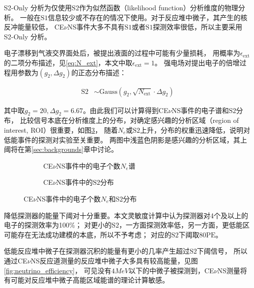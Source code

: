 S2-Only 分析为仅使用$\mathrm{S2}$作为似然函数（likelihood function）分析维度的物理分析。
一般在$\mathrm{S1}$信息较少或不存在的情况下使用。对于反应堆中微子，其产生的核反冲能量较低，
CE$\nu$NS事件大多不具有$\mathrm{S1}$或者$\mathrm{S1}$探测效率很低，所以主要采用S2-Only 分析。

电子漂移到气液交界面处后，被提出液面的过程中可能有少量损耗，
用概率为$\epsilon_\mathrm{ext}$的二项分布描述，见\ref{eq:N_ext}，本文中取$\epsilon_\mathrm{ext}=1$。
强电场对提出电子的倍增过程用参数为$(g_2,\Delta g_2)$的正态分布描述：

\begin{align}
    \label{eq:s2}
    \mathrm{S2} &\sim \mathrm{Gauss}\left(g_2,\sqrt{N_\mathrm{ext}}\cdot\Delta g_2\right)
\end{align}

其中取$g_2=20,\Delta g_2=6.67$。由此我们可以计算得到CE$\nu$NS事件的电子谱和$\mathrm{S2}$分布，
比较信号本底在分析维度上的分布，对确定感兴趣的分析区域（region of interest, ROI）很重要，如图\ref{fig:S2eS2_rate}，
随着$N_e$或$\mathrm{S2}$上升，分布的权重迅速降低，说明对低能事件的探测对实验至关重要。
两图中浅蓝色阴影是感兴趣的分析区域，其上阈将在第\ref{sec:backgrounds}章中讨论。

\begin{figure}
  \begin{subfigure}{.5\textwidth}
    \centering
    
    \caption{\label{fig:S2e_rate} CE$\nu$NS事件中的电子个数$N_e$谱}
  \end{subfigure}
  \begin{subfigure}{.5\textwidth}
    \centering
    
    \caption{\label{fig:S2_rate} CE$\nu$NS事件中的$\mathrm{S2}$分布}
  \end{subfigure}
  \caption{\label{fig:S2eS2_rate} CE$\nu$NS事件中的电子个数$N_e$和$\mathrm{S2}$分布}
\end{figure}

降低探测器的能量下阈对十分重要。本文灵敏度计算中认为探测器对4个及以上的电子的探测效率为100\%；
对更小的$\mathrm{S2}$，一方面探测效率低，另一方面，更低能区可能存在无法成功建模的本底，所以不予考虑；
对应的$\mathrm{S2}$下阈取$80\mathrm{PE}$。

低能反应堆中微子在探测器沉积的能量有更小的几率产生超过$\mathrm{S2}$下阈信号，
所以通过CE$\nu$NS反应道测量的反应堆中微子大多具有较高能量，见图\ref{fig:neutrino_efficiency}，
可见没有$4\si{MeV}$以下的中微子被探测到，CE$\nu$NS测量将有可能对反应堆中微子高能区域能谱的理论计算敏感。

